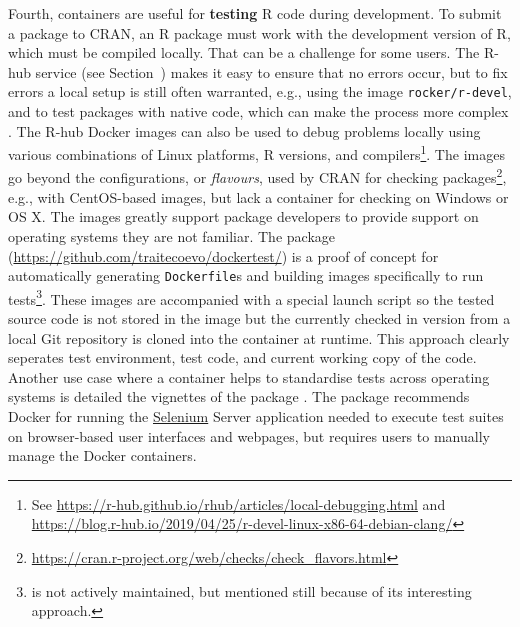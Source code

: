 Fourth, containers are useful for \textbf{testing} R code during
development. To submit a package to CRAN, an R package must work with
the development version of R, which must be compiled locally. That can
be a challenge for some users. The R-hub service (see
Section~) makes it easy to ensure that no errors occur,
but to fix errors a local setup is still often warranted, e.g., using
the image \texttt{rocker/r-devel}, and to test packages with native
code, which can make the process more complex
\citep[cf.][]{eckert_building_2018}. The R-hub Docker images can also be
used to debug problems locally using various combinations of Linux
platforms, R versions, and
compilers\footnote{See \href{https://r-hub.github.io/rhub/articles/local-debugging.html}{https://r-hub.github.io/rhub/articles/local-debugging.html} and \href{https://blog.r-hub.io/2019/04/25/r-devel-linux-x86-64-debian-clang/}{https://blog.r-hub.io/2019/04/25/r-devel-linux-x86-64-debian-clang/}}.
The images go beyond the configurations, or \emph{flavours}, used by
CRAN for checking
packages\footnote{\href{https://cran.r-project.org/web/checks/check_flavors.html}{https://cran.r-project.org/web/checks/check\_flavors.html}},
e.g., with CentOS-based images, but lack a container for checking on
Windows or OS X. The images greatly support package developers to
provide support on operating systems they are not familiar. The package
 (\url{https://github.com/traitecoevo/dockertest/}) is a
proof of concept for automatically generating \texttt{Dockerfile}s and
building images specifically to run
tests\footnote{ is not actively maintained, but mentioned still because of its interesting approach.}.
These images are accompanied with a special launch script so the tested
source code is not stored in the image but the currently checked in
version from a local Git repository is cloned into the container at
runtime. This approach clearly seperates test environment, test code,
and current working copy of the code. \label{rselenium} Another use case
where a container helps to standardise tests across operating systems is
detailed the vignettes of the package 
\citep{rselenium_2019}. The package recommends Docker for running the
\href{https://selenium.dev/}{Selenium} Server application needed to
execute test suites on browser-based user interfaces and webpages, but
requires users to manually manage the Docker containers.

